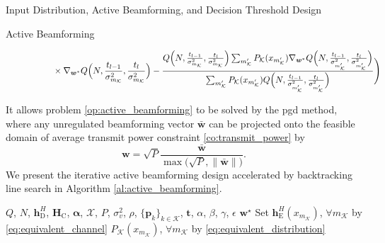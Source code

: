\documentclass[journal]{IEEEtran}
\begin{document}
\begin{section}{Input Distribution, Active Beamforming, and Decision Threshold Design}
\begin{subsection}{Active Beamforming}
\begin{figure*}[!b]
\begin{align}
				 & \qquad \times \nabla_{\boldsymbol{w}^*} Q\Bigl(N,\frac{t_{l-1}}{\sigma_{m_{\mathcal{K}}}^2},\frac{t_l}{\sigma_{m_{\mathcal{K}}}^2}\Bigr)-\frac{Q\Bigl(N,\frac{t_{l-1}}{\sigma_{m_{\mathcal{K}}}^2},\frac{t_l}{\sigma_{m_{\mathcal{K}}}^2}\Bigr)\sum_{m_{\mathcal{K}}'}P_{\mathcal{K}}(x_{m_{\mathcal{K}}'})\nabla_{\boldsymbol{w}^*}Q\Bigl(N,\frac{t_{l-1}}{\sigma_{m_{\mathcal{K}}'}^2},\frac{t_l}{\sigma_{m_{\mathcal{K}}'}^2}\Bigr)}{\sum_{m_{\mathcal{K}}'}P_{\mathcal{K}}(x_{m_{\mathcal{K}}'})Q\Bigl(N,\frac{t_{l-1}}{\sigma_{m_{\mathcal{K}}'}^2},\frac{t_l}{\sigma_{m_{\mathcal{K}}'}^2}\Bigr)}\Biggr)
				\label{eq:weighted_sum_mutual_information_gradient}
			\end{align}
		\end{figure*}
		It allows problem \eqref{op:active_beamforming} to be solved by the \gls{pgd} method, where any unregulated beamforming vector $\bar{\boldsymbol{w}}$ can be projected onto the feasible domain of average transmit power constraint \eqref{co:transmit_power} by
		\begin{equation}
			\boldsymbol{w} = \sqrt{P} \frac{\bar{\boldsymbol{w}}}{\max\bigl(\sqrt{P},\lVert\bar{\boldsymbol{w}}\rVert\bigr)}.
			\label{eq:beamforming_projection}
		\end{equation}
		We present the iterative active beamforming design accelerated by backtracking line search in Algorithm \ref{al:active_beamforming}.
		\begin{algorithm}[!t]
			\caption{Iterative Active Beamforming Design by \gls{pgd} with Backtracking Line Search}
			\label{al:active_beamforming}
			\begin{algorithmic}[1]
				\Require $Q$, $N$, $\boldsymbol{h}_{\mathrm{D}}^H$, $\boldsymbol{H}_{\mathrm{C}}$, $\boldsymbol{\alpha}$, $\mathcal{X}$, $P$, $\sigma_v^2$, $\rho$, $\{\boldsymbol{p}_k\}_{k \in \mathcal{K}}$, $\boldsymbol{t}$, $\alpha$, $\beta$, $\gamma$, $\epsilon$
				\Ensure $\boldsymbol{w}^\star$
				\State Set $\boldsymbol{h}_{\mathrm{E}}^H(x_{m_{\mathcal{K}}})$, $\forall m_{\mathcal{K}}$ by \eqref{eq:equivalent_channel}
				\State \phantom{Set} $P_{\mathcal{K}}(x_{m_{\mathcal{K}}})$, $\forall m_{\mathcal{K}}$ by \eqref{eq:equivalent_distribution}

\end{algorithmic}
\end{algorithm}
\end{subsection}
\end{section}
\end{document}
